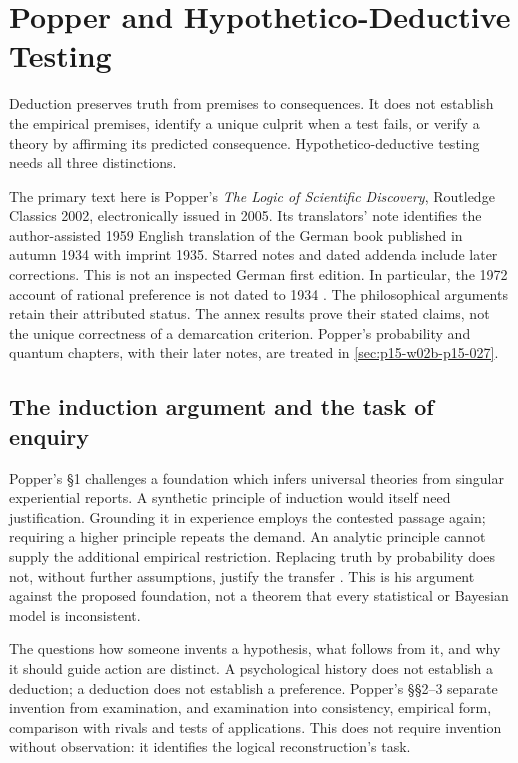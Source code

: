 \chapter{Popper and Hypothetico-Deductive Testing}
\label{sec:p15-popper-hypothetico-deductive-reasoning}

Deduction preserves truth from premises to consequences. It does not
establish the empirical premises, identify a unique culprit when a
test fails, or verify a theory by affirming its predicted consequence.
Hypothetico-deductive testing needs all three distinctions.

The primary text here is Popper's \emph{The Logic of Scientific
Discovery}, Routledge Classics 2002, electronically issued in 2005.
Its translators' note identifies the author-assisted 1959 English
translation of the German book published in autumn 1934 with imprint
1935. Starred notes and dated addenda include later corrections.
This is not an inspected German first edition. In particular,
the 1972 account of rational preference is not dated to 1934
\parencite[translators' note; \S85, addendum]{Popper2002LogicDiscoveryUI}.
The philosophical arguments retain their attributed status. The annex
results prove their stated claims, not the unique correctness
of a demarcation criterion. Popper's probability and quantum chapters,
with their later notes, are treated in \cref{sec:p15-w02b-p15-027}.

\section{The induction argument and the task of enquiry}
\label{sec:p15-popper-induction}

Popper's \S1 challenges a foundation which infers universal theories
from singular experiential reports. A synthetic principle of induction
would itself need justification. Grounding it in experience employs
the contested passage again; requiring a higher principle repeats the
demand. An analytic principle cannot supply the additional empirical
restriction. Replacing truth by probability does not, without further
assumptions, justify the transfer
\parencite[\S1]{Popper2002LogicDiscoveryUI}.
This is his argument against the proposed foundation, not a theorem
that every statistical or Bayesian model is inconsistent.

The questions how someone invents a hypothesis, what follows from it,
and why it should guide action are distinct. A psychological history
does not establish a deduction; a deduction does not establish a
preference. Popper's \S\S2--3 separate invention from examination,
and examination into consistency, empirical form, comparison with
rivals and tests of applications. This does not require invention
without observation: it identifies the logical reconstruction's task.

